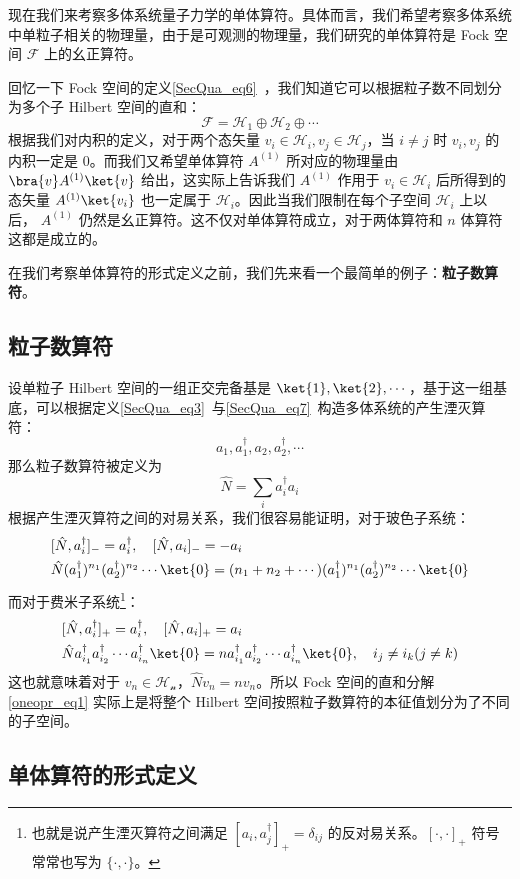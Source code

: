 

现在我们来考察多体系统量子力学的单体算符。具体而言，我们希望考察多体系统中单粒子相关的物理量，由于是可观测的物理量，我们研究的单体算符是 Fock 空间 $\mathcal{F}$ 上的幺正算符。

回忆一下 Fock 空间的定义\autoref{SecQua_eq6}~，我们知道它可以根据粒子数不同划分为多个子 Hilbert 空间的直和：
\begin{equation}\label{oneopr_eq1}
\mathcal{F}=\mathcal{H}_1\oplus \mathcal{H}_2\oplus \cdots
\end{equation}
根据我们对内积的定义，对于两个态矢量 $v_i\in \mathcal{H}_i, v_j\in \mathcal{H}_j$，当 $i\neq j$ 时 $v_i,v_j$ 的内积一定是 $0$。而我们又希望单体算符 $A^{(1)}$ 所对应的物理量由 $\bra{v}A^{(1)} \ket{v}$ 给出，这实际上告诉我们 $A^{(1)}$ 作用于 $v_i\in \mathcal{H}_i$ 后所得到的态矢量 $A^{(1)} \ket{v_i}$ 也一定属于 $\mathcal{H}_i$。因此当我们限制在每个子空间 $\mathcal{H}_i$ 上以后， $A^{(1)}$ 仍然是幺正算符。这不仅对单体算符成立，对于两体算符和 $n$ 体算符这都是成立的。

在我们考察单体算符的形式定义之前，我们先来看一个最简单的例子：\textbf{粒子数算符}。
\subsection{粒子数算符}
设单粒子 Hilbert 空间的一组正交完备基是 $\ket{1},\ket{2},\cdots$，基于这一组基底，可以根据定义\autoref{SecQua_eq3}~与\autoref{SecQua_eq7}~构造多体系统的产生湮灭算符：
\begin{equation}
a_1,a^\dagger_1,a_2,a^\dagger_2,\cdots
\end{equation}
那么粒子数算符被定义为
\begin{equation}
\hat N=\sum_i a_i^\dagger a_i
\end{equation}
根据产生湮灭算符之间的对易关系，我们很容易能证明，对于玻色子系统：
\begin{equation}
\begin{aligned}
&[\hat N,a_i^\dagger]_-=a_i^\dagger,\quad [\hat N,a_i]_-=-a_i\\
&\hat N (a_1^\dagger)^{n_1} (a_2^\dagger)^{n_2}\cdots \ket{0} = (n_1+n_2+\cdots)   (a_1^\dagger)^{n_1} (a_2^\dagger)^{n_2}\cdots \ket{0} 
\end{aligned}
\end{equation}
而对于费米子系统\footnote{也就是说产生湮灭算符之间满足 $[a_i,a_j^\dagger]_+=\delta_{ij}$ 的反对易关系。$[\cdot,\cdot]_+$ 符号常常也写为 $\{\cdot,\cdot\}$。}：
\begin{equation}
\begin{aligned}
&[\hat N,a_i^\dagger]_+=a_i^\dagger,\quad [\hat N,a_i]_+=a_i\\
&\hat N a_{i_1}^\dagger a_{i_2}^\dagger \cdots a_{i_n}^\dagger \ket{0}= n a_{i_1}^\dagger a_{i_2}^\dagger \cdots a_{i_n}^\dagger \ket{0},\quad i_j\neq i_k(j\neq k)
\end{aligned}
\end{equation}
这也就意味着对于 $v_n\in \mathcal{H_n}$，$\hat N v_n=n v_n$。所以 Fock 空间的直和分解 \autoref{oneopr_eq1} 实际上是将整个 Hilbert 空间按照粒子数算符的本征值划分为了不同的子空间。
\subsection{单体算符的形式定义}